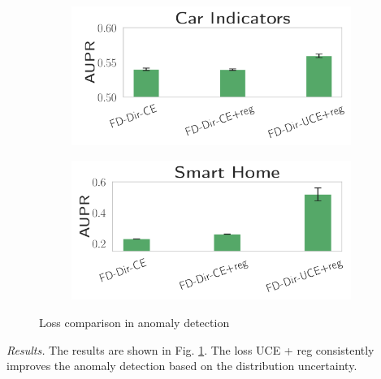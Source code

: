 \begin{figure}[H]
\centering
    \begin{subfigure}{0.3\textwidth}
        \centering
        \includegraphics[width=\linewidth]{sections/010_neurips2019/paper/images/uncertainty-apr-bmw-indicator-ok3.png}
    \end{subfigure}%
    \begin{subfigure}{0.3\textwidth}
        \centering
        \includegraphics[width=\linewidth]{sections/010_neurips2019/paper/images/uncertainty-apr-kast-home-ok3.png}
    \end{subfigure}%
    \caption{Loss comparison in anomaly detection}
    \label{fig:loss_comparison}
    \vspace{-0.5cm}
\end{figure}

\textit{Results.} The results are shown in Fig. \ref{fig:loss_comparison}. The loss UCE + reg consistently improves the anomaly detection based on the distribution uncertainty.
